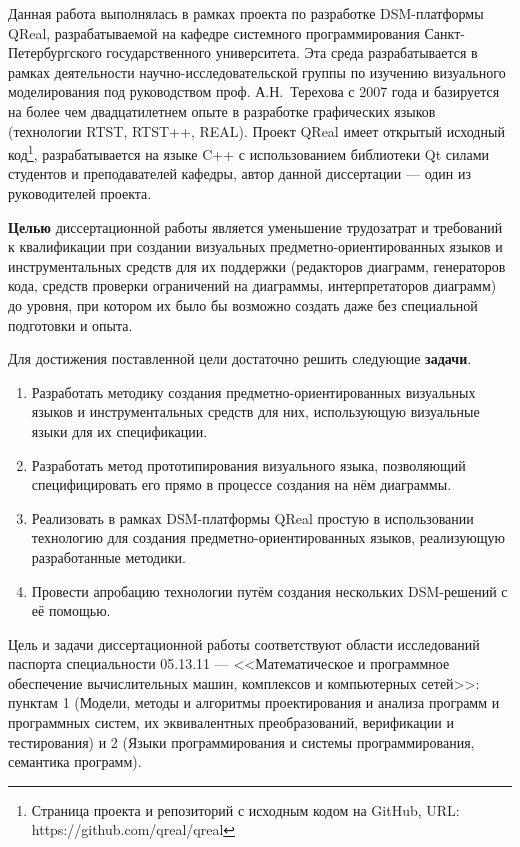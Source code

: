 Данная работа выполнялась в рамках проекта по разработке DSM-платформы QReal, разрабатываемой на кафедре системного программирования
Санкт-Петербургского государственного университета. Эта среда разрабатывается в рамках 
деятельности научно-исследовательской группы по изучению визуального моделирования 
под руководством проф. А.Н.~Терехова с 2007 года и базируется на более чем двадцатилетнем 
опыте в разработке графических языков (технологии RTST, RTST++, REAL). Проект QReal имеет 
открытый исходный код\footnote{Страница проекта и репозиторий с исходным кодом на GitHub, URL: https://github.com/qreal/qreal}, 
разрабатывается на языке C++ с использованием библиотеки Qt силами студентов и преподавателей 
кафедры, автор данной диссертации --- один из руководителей проекта.

\textbf{Целью} диссертационной работы является уменьшение трудозатрат и требований к квалификации
при создании визуальных предметно-ориентированных языков и инструментальных средств для их поддержки 
(редакторов диаграмм, генераторов кода, средств проверки ограничений на диаграммы, интерпретаторов диаграмм)
до уровня, при котором их было бы возможно создать даже без специальной подготовки и опыта.

Для достижения поставленной цели достаточно решить следующие \textbf{задачи}.
\begin{enumerate}
	\item Разработать методику создания предметно-ориентированных визуальных языков и инструментальных 
		средств для них, использующую визуальные языки для их спецификации.
	\item Разработать метод прототипирования визуального языка, позволяющий специфицировать его
		прямо в процессе создания на нём диаграммы.
	\item Реализовать в рамках DSM-платформы QReal простую в использовании технологию 
		для создания предметно-ориентированных языков, реализующую разработанные методики.
	\item Провести апробацию технологии путём создания нескольких DSM-решений с её помощью.
\end{enumerate}

Цель и задачи диссертационной работы соответствуют области исследований паспорта специальности 
05.13.11 --- <<Математическое и программное обеспечение вычислительных машин, комплексов и компьютерных сетей>>: 
пунктам 1 (Модели, методы и алгоритмы проектирования и анализа программ и программных 
систем, их эквивалентных преобразований, верификации и тестирования) и 2 (Языки программирования 
и системы программирования, семантика программ).


